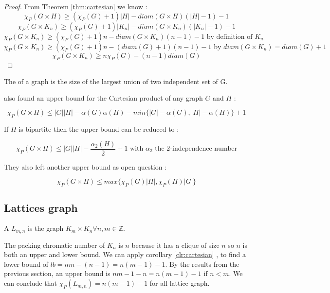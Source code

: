 \begin{proof}
From Theorem \ref{thm:cartesian} we know :
\[ \chi_{P}(G \times H) \geq (\chi_{P}(G) +1)|H| - diam(G \times H)(|H| - 1) - 1 \]
\[ \chi_{P}(G \times K_n) \geq (\chi_{P}(G) +1)|K_n| - diam(G \times K_n)(|K_n| - 1) - 1 \]
\[ \chi_{P}(G \times K_n) \geq (\chi_{P}(G) +1)n - diam(G \times K_n)(n - 1) - 1 \text{ by definition of $K_n$} \]
\[ \chi_{P}(G \times K_n) \geq (\chi_{P}(G) +1)n - (diam(G)+1)(n - 1) - 1 \text{ by $diam(G \times K_n) = diam(G) +1$ } \] %
\[\chi_{P}(G \times K_n) \geq n\chi_P(G) - (n-1)diam(G) \]

\end{proof}

\begin{mydef}
The  of a graph is the size of the largest union of two independent set of G.
\end{mydef}

\cite{PCNLatice} also found an upper bound for the Cartesian product of any graph $G$ and $H$ :

\[ \chi_{P}(G \times H) \leq  |G||H| -  \alpha(G)\alpha(H) - min\{|G| - \alpha(G), |H| - \alpha(H) \} + 1\]

If $H$ is bipartite then the upper bound can be reduced to :

\[ \chi_{P}(G \times H) \leq  |G||H| -  \frac{\alpha_2(H)}{2} + 1 \text{ with $\alpha_2$ the 2-independence number}\]




They also left another upper bound as open question :

\[\chi_{P}(G \times H) \leq max\{\chi_P(G)|H|,\chi_P(H)|G| \} \]

\subsection{Lattices graph}

\begin{mydef}
A  $L_{m,n}$ is the graph  $K_m \times K_n \forall n,m \in \mathbb{Z}$.
\end{mydef}

The packing chromatic number of $K_n$ is $n$ because it has a clique of size $n$ so $n$ is both an upper and lower bound. We can apply corollary \ref{clr:cartesian} , to find a lower bound of $lb = nm - (n-1) = n(m-1) -1$. By the results from the previous section, an upper bound is $nm - 1 -n = n(m-1) -1$ if $n<m$. We can conclude that $\chi_P(L_{m,n}) = n(m-1) - 1$ for all lattice graph.\\

